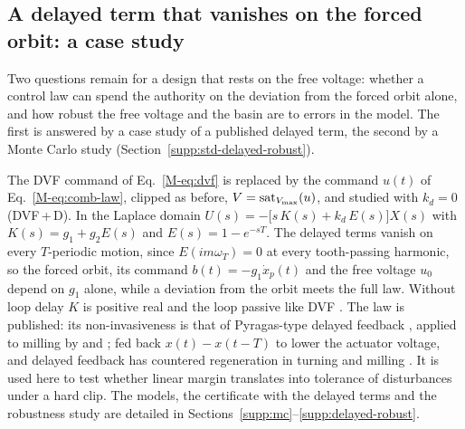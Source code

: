 
\subsection{A delayed term that vanishes on the forced orbit: a case study}\label{supp:std-delayed-law}

Two questions remain for a design that rests on the free voltage: whether a control law can spend the authority on the deviation from the forced orbit alone, and how robust the free voltage and the basin are to errors in the model. The first is answered by a case study of a published delayed term, the second by a Monte Carlo study (Section~\ref{supp:std-delayed-robust}).

The DVF command of Eq.~\eqref{M-eq:dvf} is replaced by the command $u(t)$ of Eq.~\eqref{M-eq:comb-law}, clipped as before, $V=\operatorname{sat}_{V_{\max}}(u)$, and studied with $k_d=0$ (DVF\,+\,D). In the Laplace domain $U(s)=-\bigl[s\,K(s)+k_d\,E(s)\bigr]X(s)$ with $K(s)=g_1+g_2E(s)$ and $E(s)=1-e^{-sT}$. The delayed terms vanish on every $T$-periodic motion, since $E(im\omega_T)=0$ at every tooth-passing harmonic, so the forced orbit, its command $b(t)=-g_1\dot x_p(t)$ and the free voltage $u_0$ depend on $g_1$ alone, while a deviation from the orbit meets the full law. Without loop delay $K$ is positive real and the loop passive like DVF \citep{elliott2001feedback}. The law is published: its non-invasiveness is that of Pyragas-type delayed feedback \citep{pyragas1992continuous}, applied to milling by \citet{vandewouw2015ifac} and \citet{vandijk2015ijrnc}; \citet{li2022ijamt} fed back $x(t)-x(t-T)$ to lower the actuator voltage, and delayed feedback has countered regeneration in turning \citep{mancisidor2019mechatronics} and milling \citep{du2022time,du2024ijms}. It is used here to test whether linear margin translates into tolerance of disturbances under a hard clip. The models, the certificate with the delayed terms and the robustness study are detailed in Sections~\ref{supp:mc}--\ref{supp:delayed-robust}.

